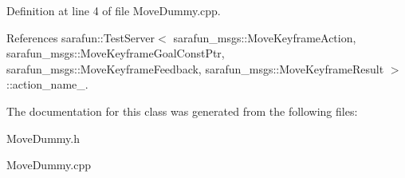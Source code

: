 Definition at line 4 of file Move\-Dummy.\-cpp.



References sarafun\-::\-Test\-Server$<$ sarafun\-\_\-msgs\-::\-Move\-Keyframe\-Action, sarafun\-\_\-msgs\-::\-Move\-Keyframe\-Goal\-Const\-Ptr, sarafun\-\_\-msgs\-::\-Move\-Keyframe\-Feedback, sarafun\-\_\-msgs\-::\-Move\-Keyframe\-Result $>$\-::action\-\_\-name\-\_\-.



The documentation for this class was generated from the following files\-:\begin{DoxyCompactItemize}
\item 
Move\-Dummy.\-h\item 
Move\-Dummy.\-cpp\end{DoxyCompactItemize}
